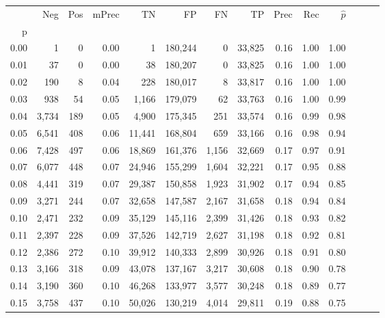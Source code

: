 \begin{tabular}{rrrrrrrrrrrrrr}
\toprule
{} &    Neg &  Pos & mPrec &       TN &       FP &      FN &      TP &  Prec &   Rec & $\hat{p}$ \\
p    &        &      &       &          &          &         &         &       &       &           \\
\midrule
0.00 &      1 &    0 &  0.00 &        1 &  180,244 &       0 &  33,825 &  0.16 &  1.00 &      1.00 \\
0.01 &     37 &    0 &  0.00 &       38 &  180,207 &       0 &  33,825 &  0.16 &  1.00 &      1.00 \\
0.02 &    190 &    8 &  0.04 &      228 &  180,017 &       8 &  33,817 &  0.16 &  1.00 &      1.00 \\
0.03 &    938 &   54 &  0.05 &    1,166 &  179,079 &      62 &  33,763 &  0.16 &  1.00 &      0.99 \\
0.04 &  3,734 &  189 &  0.05 &    4,900 &  175,345 &     251 &  33,574 &  0.16 &  0.99 &      0.98 \\
0.05 &  6,541 &  408 &  0.06 &   11,441 &  168,804 &     659 &  33,166 &  0.16 &  0.98 &      0.94 \\
0.06 &  7,428 &  497 &  0.06 &   18,869 &  161,376 &   1,156 &  32,669 &  0.17 &  0.97 &      0.91 \\
0.07 &  6,077 &  448 &  0.07 &   24,946 &  155,299 &   1,604 &  32,221 &  0.17 &  0.95 &      0.88 \\
0.08 &  4,441 &  319 &  0.07 &   29,387 &  150,858 &   1,923 &  31,902 &  0.17 &  0.94 &      0.85 \\
0.09 &  3,271 &  244 &  0.07 &   32,658 &  147,587 &   2,167 &  31,658 &  0.18 &  0.94 &      0.84 \\
0.10 &  2,471 &  232 &  0.09 &   35,129 &  145,116 &   2,399 &  31,426 &  0.18 &  0.93 &      0.82 \\
0.11 &  2,397 &  228 &  0.09 &   37,526 &  142,719 &   2,627 &  31,198 &  0.18 &  0.92 &      0.81 \\
0.12 &  2,386 &  272 &  0.10 &   39,912 &  140,333 &   2,899 &  30,926 &  0.18 &  0.91 &      0.80 \\
0.13 &  3,166 &  318 &  0.09 &   43,078 &  137,167 &   3,217 &  30,608 &  0.18 &  0.90 &      0.78 \\
0.14 &  3,190 &  360 &  0.10 &   46,268 &  133,977 &   3,577 &  30,248 &  0.18 &  0.89 &      0.77 \\
0.15 &  3,758 &  437 &  0.10 &   50,026 &  130,219 &   4,014 &  29,811 &  0.19 &  0.88 &      0.75 \\

\end{tabular}
